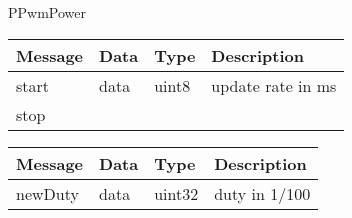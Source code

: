  {PPwmPower}

\begin{tabular}[ht]{|l|l|l|p{8cm}|}
\hline
Message & Data & Type & Description\\
\hline
start &  data  &  uint8  & %
update rate in ms
\\
\hline
stop &  &  & \\
\hline
\end{tabular}
\begin{tabular}[ht]{|l|l|l|p{8cm}|}
\hline
Message & Data & Type & Description\\
\hline
newDuty &  data  &  uint32  & %
duty in 1/100 %
\\
\hline
\end{tabular}
